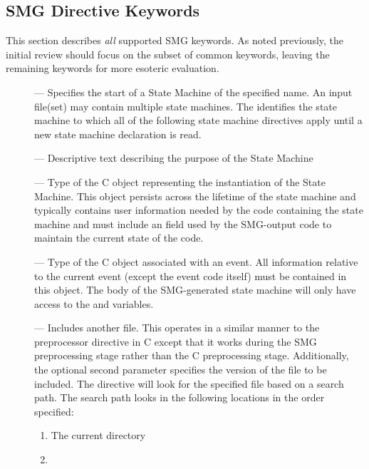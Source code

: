 
\subsection{SMG Directive Keywords}

This section describes {\em all} supported SMG keywords.  As noted
previously, the initial review should focus on the subset of common
keywords, leaving the remaining keywords for more esoteric evaluation.



\begin{description}
  
\item[\hypertarget{SMNAME}{}] --- Specifies the start of a
  State Machine of the specified name.  An input  file(set)
  may contain multiple state machines.  The  identifies the
  state machine to which all of the following state machine directives
  apply until a new  state machine declaration is read.
  
\item[\hypertarget{SMDESC}{}] --- Descriptive text describing
  the purpose of the State Machine
  
\item[\hypertarget{SMOBJ}{}] --- Type of the C object
  representing the instantiation of the State Machine.  This object
  persists across the lifetime of the state machine and typically
  contains user information needed by the code containing the state
  machine and must include an  field used by the
  SMG-output code to maintain the current state of the code.
  
\item[\hypertarget{SMEVT}{}] --- Type of the C object
  associated with an event.  All information relative to the current
  event (except the event code itself) must be contained in this
  object. The body of the SMG-generated state machine will only have
  access to the \SMOBJ and  variables.
  
\item[\hypertarget{SMINCL}{}] --- Includes another file.
  This operates in a similar manner to the 
  preprocessor directive in C except that it works during the SMG
  preprocessing stage rather than the C preprocessing stage.
  Additionally, the optional second parameter specifies the version of
  the file to be included.  The \SMINCL directive will look for the
  specified file based on a search path.  The search path looks in the
  following locations in the order specified:
  \begin{enumerate}
  \item The current directory
  \item {}
    

\end{enumerate}
\end{description}
